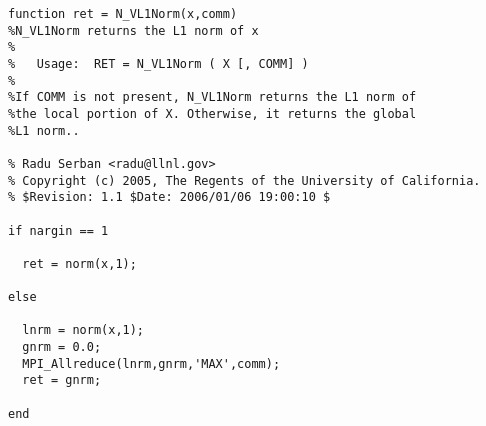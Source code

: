 \begin{lstlisting}[linerange={1-1,9-26}]
function ret = N_VL1Norm(x,comm)
%N_VL1Norm returns the L1 norm of x
%
%   Usage:  RET = N_VL1Norm ( X [, COMM] )
%
%If COMM is not present, N_VL1Norm returns the L1 norm of 
%the local portion of X. Otherwise, it returns the global
%L1 norm..

% Radu Serban <radu@llnl.gov>
% Copyright (c) 2005, The Regents of the University of California.
% $Revision: 1.1 $Date: 2006/01/06 19:00:10 $

if nargin == 1
  
  ret = norm(x,1);
  
else
  
  lnrm = norm(x,1);
  gnrm = 0.0;
  MPI_Allreduce(lnrm,gnrm,'MAX',comm);
  ret = gnrm;
  
end\end{lstlisting}
